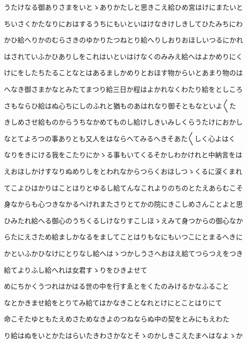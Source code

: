 \documentclass[a4paper,11pt,landscape]{ltjtarticle}
\begin{document}
\par\medskip
うたけなる御ありさまをいとゝありかたしと思きこえ給ひめ宮はけにまたいと
\par\medskip
ちいさくかたなりにおはするうちにもいといはけなきけしきしてひたみちにわ
\par\medskip
かひ給へりかのむらさきのゆかりたつねとり給へりしおりおほしいつるにかれ
\par\medskip
はされていふかひありしをこれはいといはけなくのみみえ給へはよかめりにく
\par\medskip
けにをしたちたることなとはあるましかめりとおほす物からいとあまり物のは
\par\medskip
へなき御さまかなとみたてまつり給三日か程はよかれなくわたり給をとしころ
\par\medskip
さもならひ給はぬ心ちにしのふれと猶ものあはれなり御そともなといよ〱た
\par\medskip
きしめさせ給ものからうちなかめてものし給けしきいみしくらうたけにおかし
\par\medskip
なとてよろつの事ありとも又人をはならへてみるへきそあた〱しく心よはく
\par\medskip
なりをきにける我をこたりにかゝる事もいてくるそかしわかけれと中納言をは
\par\medskip
えおほしかけすなりぬめりしをとわれなからつらくおほしつゝくるに涙くまれ
\par\medskip
てこよひはかりはことはりとゆるし給てんなこれよりのちのとたえあらむこそ
\par\medskip
身なからも心つきなかるへけれまたさりとてかの院にきこしめさんことよと思
\par\medskip
ひみたれ給へる御心のうちくるしけなりすこしほゝえみて身つからの御心なか
\par\medskip
らたにえさため給ましかなるをましてことはりもなにもいつこにとまるへきに
\par\medskip
かといふかひなけにとりなし給へはゝつかしうさへおほえ給てつらつえをつき
\par\medskip
給てよりふし給へれは女君すゝりをひきよせて
\par\medskip
めにちかくうつれはかはる世の中を行すゑとをくたのみけるかなふること
\par\medskip
なとかきませ給をとりてみ給てはかなきことなれとけにとことはりにて
\par\medskip
命こそたゆともたえめさためなきよのつねならぬ中の契をとみにもえわた
\par\medskip
り給はぬをいとかたはらいたきわさかなとそゝのかしきこえたまへはなよゝか
\par\medskip
\end{document}
